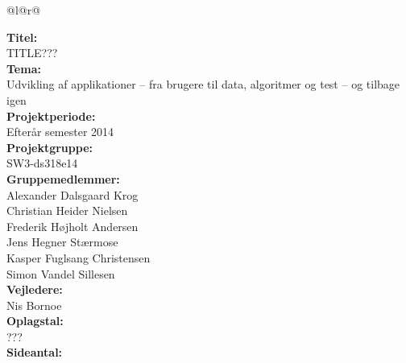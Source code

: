 \pagestyle{titlepagestyle}


\begin{nopagebreak}
{\begin{center}
    \begin{tabular*}{\textwidth}{@{}l@{\extracolsep{\fill}}r@{}}
        \\
        \begin{minipage}[t]{0.49\textwidth}
            \textbf{Titel:}\\
            TITLE???\\

            \textbf{Tema:}\\
            Udvikling af applikationer – fra brugere til data, algoritmer og test – og tilbage igen\\

            \textbf{Projektperiode:}\\
            Efterår semester 2014\\

            \textbf{Projektgruppe:}\\
            SW3-ds318e14\\

            \textbf{Gruppemedlemmer:}\\
            Alexander Dalsgaard Krog\\
            Christian Heider Nielsen\\
            Frederik Højholt Andersen\\
            Jens Hegner Stærmose\\
            Kasper Fuglsang Christensen\\
            Simon Vandel Sillesen\\

            \textbf{Vejledere:}\\
            Nis Bornoe\\

            \textbf{Oplagstal:}\\
            ???\\

            \textbf{Sideantal:}\\
            \pageref{LastPage}\\ 


\end{minipage}
\end{tabular*}
\end{center}}
\end{nopagebreak}
